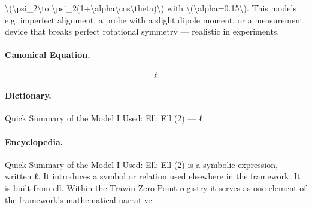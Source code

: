 \textbackslash{}(\textbackslash{}psi\_2\textbackslash{}to \textbackslash{}psi\_2(1+\textbackslash{}alpha\textbackslash{}cos\textbackslash{}theta)\textbackslash{}) with \textbackslash{}(\textbackslash{}alpha=0.15\textbackslash{}). This models e.g. imperfect alignment, a probe with a slight dipole moment, or a measurement device that breaks perfect rotational symmetry — realistic in experiments.

\paragraph{Canonical Equation.}
\[
\ell
\]

\paragraph{Dictionary.}
Quick Summary of the Model I Used: Ell: Ell (2) — ℓ

\paragraph{Encyclopedia.}
Quick Summary of the Model I Used: Ell: Ell (2) is a symbolic expression, written ℓ. It introduces a symbol or relation used elsewhere in the framework. It is built from ell. Within the Trawin Zero Point registry it serves as one element of the framework's mathematical narrative.
